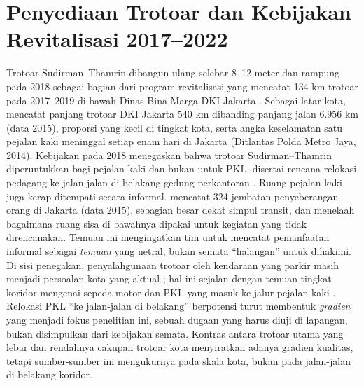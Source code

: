 \documentclass[11pt,a4paper]{report}
\begin{document}
\section{Penyediaan Trotoar dan Kebijakan Revitalisasi 2017--2022}
Trotoar Sudirman--Thamrin dibangun ulang selebar 8--12 meter dan rampung pada 2018 sebagai
bagian dari program revitalisasi yang mencatat 134 km trotoar pada 2017--2019 di bawah Dinas
Bina Marga DKI Jakarta \autocite{beritajakarta2019}. %
Sebagai latar kota, \textcite{itdp2019} mencatat panjang trotoar DKI Jakarta 540 km dibanding
panjang jalan 6.956 km (data 2015), proporsi yang kecil di tingkat kota, serta angka
keselamatan satu pejalan kaki meninggal setiap enam hari di Jakarta (Ditlantas Polda Metro Jaya,
2014). %
Kebijakan pada 2018 menegaskan bahwa trotoar Sudirman--Thamrin diperuntukkan bagi pejalan kaki
dan bukan untuk PKL, disertai rencana relokasi pedagang ke jalan-jalan di belakang gedung
perkantoran \autocite{merdeka2018pkl}. %
Ruang pejalan kaki juga kerap ditempati secara informal. \textcite{putri2020residual} mencatat
324 jembatan penyeberangan orang di Jakarta (data 2015), sebagian besar dekat simpul transit, dan
menelaah bagaimana ruang sisa di bawahnya dipakai untuk kegiatan yang tidak direncanakan. Temuan
ini mengingatkan tim untuk mencatat pemanfaatan informal sebagai \emph{temuan} yang netral, bukan
semata ``halangan'' untuk dihakimi. %
Di sisi penegakan, penyalahgunaan trotoar oleh kendaraan yang parkir masih menjadi persoalan
kota yang aktual \autocite{kompas2026trotoar}; hal ini sejalan dengan temuan tingkat koridor
mengenai sepeda motor dan PKL yang masuk ke jalur pejalan kaki \autocite{dwisadana2024}.
Relokasi PKL ``ke jalan-jalan di belakang'' \autocite{merdeka2018pkl} berpotensi turut membentuk
\emph{gradien} yang menjadi fokus penelitian ini, sebuah dugaan yang harus diuji di lapangan,
bukan disimpulkan dari kebijakan semata. Kontras antara trotoar utama yang lebar dan rendahnya
cakupan trotoar kota menyiratkan adanya gradien kualitas, tetapi sumber-sumber ini mengukurnya
pada skala kota, bukan pada jalan-jalan di belakang koridor.
\end{document}
